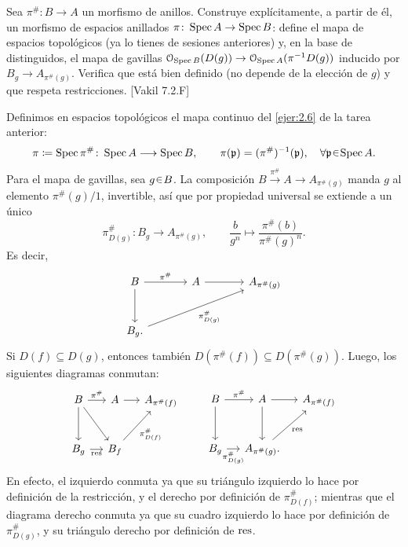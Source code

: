 \begin{ejer}\label{ejer:t3-spec-funtor}
Sea $\pi^\#\colon B\to A$ un morfismo de anillos. Construye explícitamente, a partir de él, un morfismo de espacios anillados $\pi\colon\operatorname{Spec} A\to\operatorname{Spec} B$: define el mapa de espacios topológicos (ya lo tienes de sesiones anteriores) y, en la base de distinguidos, el mapa de gavillas $\mathcal O_{\operatorname{Spec} B}(D(g))\to\mathcal O_{\operatorname{Spec} A}(\pi^{-1}D(g))$ inducido por $B_g\to A_{\pi^\#(g)}$. Verifica que está bien definido (no depende de la elección de $g$) y que respeta restricciones. \hfill [Vakil 7.2.F]
\end{ejer}
\begin{sol}
Definimos en espacios topológicos el mapa continuo del \cref{ejer:2.6} de la tarea anterior:
\[
\pi\coloneq\Spec\pi^\#\colon\Spec A\longrightarrow\Spec B,
\qquad\pi(\mathfrak p)=(\pi^\#)^{-1}(\mathfrak p),\quad\forall\mathfrak p\en\Spec A.
\]
Para el mapa de gavillas, sea $g\en B$. La composición $B\xrightarrow{\pi^\#}A\to A_{\pi^\#(g)}$ manda $g$ al elemento $\pi^\#(g)/1$, invertible, así que por propiedad universal se extiende a un único
\[
\pi^\#_{D(g)}\colon B_g\longrightarrow A_{\pi^\#(g)},
\qquad\frac{b}{g^n}\longmapsto\frac{\pi^\#(b)}{\pi^\#(g)^n}.
\]
Es decir,
\[
\begin{tikzcd}[column sep=large,row sep=large]
B\arrow[r,"\pi^\#"]\arrow[d]&A\arrow[r]&A_{\pi^\#(g)}\\
B_g\arrow[urr,"\pi^\#_{D(g)}"'].
\end{tikzcd}
\]
Si $D(f)\subseteq D(g)$, entonces también $D(\pi^\#(f))\subseteq D(\pi^\#(g))$. Luego, los siguientes diagramas conmutan:
\[
\begin{tikzcd}[column sep=small,row sep=large]
B\arrow[r,"\pi^\#"]\arrow[d]\arrow[dr]&A\arrow[r]&A_{\pi^\#(f)}\\
B_g\arrow[r,"\res"']&B_f\arrow[ur,"\pi^\#_{D(f)}"']
\end{tikzcd}
\qquad
\begin{tikzcd}[column sep=small,row sep=large]
B\arrow[r,"\pi^\#"]\arrow[d]&A\arrow[r]\arrow[d]&A_{\pi^\#(f)}\\
B_g\arrow[r,"\pi^\#_{D(g)}"']&A_{\pi^\#(g)}\arrow[ur,"\res"'].
\end{tikzcd}
\]
En efecto, el izquierdo conmuta ya que su triángulo izquierdo lo hace por definición de la restricción, y el derecho por definición de $\pi^\#_{D(f)}$; mientras que el diagrama derecho conmuta ya que su cuadro izquierdo lo hace por definición de $\pi^\#_{D(g)}$, y su triángulo derecho por definición de $\operatorname{res}$.


\end{sol}
